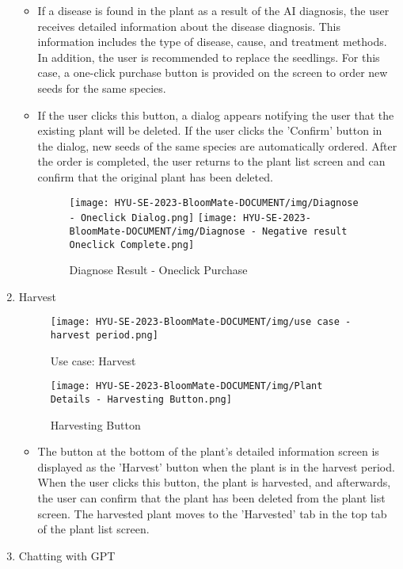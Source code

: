 \documentclass[conference, a4paper]{IEEEtran}
\begin{document}
\begin{enumerate}
\begin{itemize}
    \item If a disease is found in the plant as a result of the AI diagnosis, the user receives detailed information about the disease diagnosis. This information includes the type of disease, cause, and treatment methods. In addition, the user is recommended to replace the seedlings. For this case, a one-click purchase button is provided on the screen to order new seeds for the same species. 
    \item If the user clicks this button, a dialog appears notifying the user that the existing plant will be deleted. If the user clicks the 'Confirm' button in the dialog, new seeds of the same species are automatically ordered. After the order is completed, the user returns to the plant list screen and can confirm that the original plant has been deleted.
    \begin{figure}[h]
    \centerline{
        \texttt{[image: HYU-SE-2023-BloomMate-DOCUMENT/img/Diagnose - Oneclick Dialog.png]}
        \texttt{[image: HYU-SE-2023-BloomMate-DOCUMENT/img/Diagnose - Negative result Oneclick Complete.png]}
    }
    \label{fig}
    \caption{Diagnose Result - Oneclick Purchase}
    \end{figure}
    \end{itemize}
    
\item Harvest
        \begin{figure}[h]
        \centering
        \texttt{[image: HYU-SE-2023-BloomMate-DOCUMENT/img/use case -harvest period.png]}
        \caption{Use case: Harvest}
        \label{fig}
        \end{figure}
        
        \begin{figure}[h]
        \centering
        \texttt{[image: HYU-SE-2023-BloomMate-DOCUMENT/img/Plant Details - Harvesting Button.png]}
        \caption{Harvesting Button}
        \label{fig:Harvesting Button}
        \end{figure}
    \begin{itemize}
        \item The button at the bottom of the plant's detailed information screen is displayed as the 'Harvest' button when the plant is in the harvest period. When the user clicks this button, the plant is harvested, and afterwards, the user can confirm that the plant has been deleted from the plant list screen. The harvested plant moves to the 'Harvested' tab in the top tab of the plant list screen.
    \end{itemize}
\item Chatting with GPT


\end{enumerate}
\end{document}
